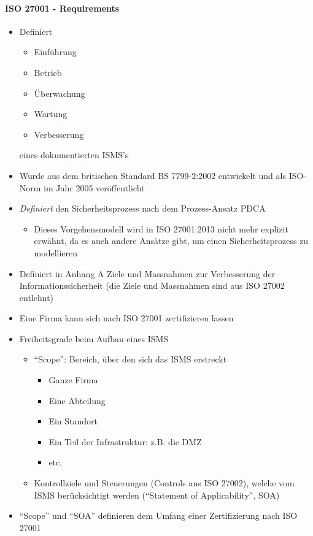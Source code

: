 \documentclass[10pt,a4paper]{article}
\begin{document}
\paragraph*{ISO 27001 - Requirements}\label{para:ISO 27001}
\begin{itemize}[noitemsep,topsep=0pt,leftmargin=*]
    \item Definiert
    \begin{itemize}[noitemsep,topsep=0pt,leftmargin=*]
        \item Einführung
        \item Betrieb
        \item Überwachung
        \item Wartung
        \item Verbesserung
    \end{itemize}
    eines dokumentierten ISMS's
    \item Wurde aus dem britischen Standard BS 7799-2:2002 entwickelt und als ISO-Norm im Jahr 2005 veröffentlicht
    \item \textsl{Definiert} den Sicherheitsprozess nach dem Prozess-Ansatz PDCA
    \begin{itemize}[noitemsep,topsep=0pt,leftmargin=*]
        \item Dieses Vorgehensmodell wird in ISO 27001:2013 nicht mehr explizit erwähnt, da es auch andere Ansätze gibt, um einen Sicherheitsprozess zu modellieren
    \end{itemize}
    \item Definiert in Anhang A Ziele und Massnahmen zur Verbesserung der Informationssicherheit (die Ziele und Massnahmen sind aus ISO 27002 entlehnt)
    \item Eine Firma kann sich nach ISO 27001 zertifizieren lassen
    \item Freiheitsgrade beim Aufbau eines ISMS
    \begin{itemize}[noitemsep,topsep=0pt,leftmargin=*]
        \item "`Scope"': Bereich, über den sich das ISMS erstreckt
        \begin{itemize}[noitemsep,topsep=0pt,leftmargin=*]
            \item Ganze Firma
            \item Eine Abteilung
            \item Ein Standort
            \item Ein Teil der Infrastruktur: z.B. die DMZ
            \item etc.
        \end{itemize}
        \item Kontrollziele und Steuerungen (\flqq Controls\frqq{} aus ISO 27002), welche vom ISMS berücksichtigt werden ("`Statement of Applicability"', SOA)
    \end{itemize}
    \item "`Scope"' und "`SOA"' definieren dem Umfang einer Zertifizierung nach ISO 27001
\end{itemize}
\end{document}
